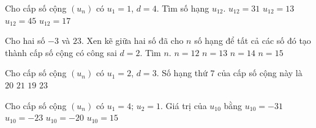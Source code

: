\begin{ex}%
	Cho cấp số cộng $\left(u_n \right)$ có $u_1=1$,  $d=4$. Tìm số hạng $u_{12}$.
	\choice 
		{$u_{12}=31$} 
		 {$u_{12}=13$}
		{\True  $u_{12}=45$}
		 {$u_{12}=17$}
\end{ex}

\begin{ex}%
	Cho hai số $-3$ và $23$. Xen kẽ giữa hai số đã cho $n$ số hạng để tất cả các số đó tạo thành cấp số  cộng có công sai $d=2$. Tìm $n$.
	 \choice
		{\True  $n=12$}
		 {$n=13$}
		 {$n=14$}
		 {$n=15$}
\end{ex}

\begin{ex}%
	Cho cấp số  cộng $\left(u_n \right)$ có $u_1=2$, $d=3$. Số hạng thứ $7$ của cấp số cộng này là
	\choice 
		{\True $20$} 
		 {$21$}
		{$19$} 
		{$23$} 
\end{ex}

\begin{ex}%
	Cho cấp số  cộng $(u_n)$ có $u_1=4$; $u_2=1$. Giá trị của $u_{10}$ bằng
	 \choice
		 {$u_{10}=-31$}
		{\True $u_{10}=-23$} 
		{$u_{10}=-20$} 
		 {$u_{10}=15$}
\end{ex}



